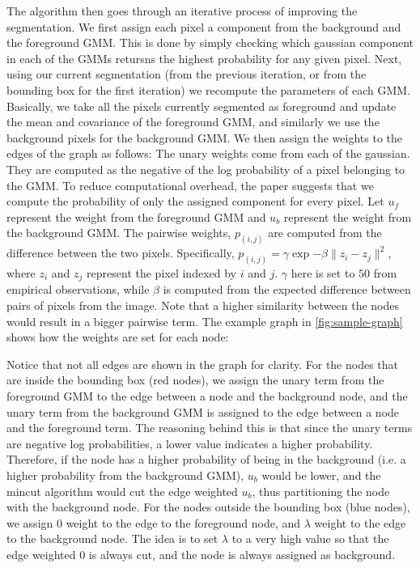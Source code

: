 \documentclass[10pt,twocolumn,letterpaper]{article}
\begin{document}
The algorithm then goes through an iterative process of improving the segmentation.  We first assign each pixel a component from the background and the foreground GMM. This is done by simply checking which gaussian component in each of the GMMs retursns the highest probability for any given pixel. Next, using our current segmentation (from the previous iteration, or from the bounding box for the first iteration) we recompute the parameters of each GMM. Basically, we take all the pixels currently segmented as foreground and update the mean and covariance of the foreground GMM, and similarly we use the background pixels for the background GMM. We then assign the weights to the edges of the graph as follows: The unary weights come from each of the gaussian. They are computed as the negative of the log probability of a pixel belonging to the GMM. To reduce computational overhead, the paper suggests that we compute the probability of only the assigned component for every pixel. Let $u_f$ represent the weight from the foreground GMM and $u_b$ represent the weight from the background GMM. The pairwise weights, $p_{(i,j)}$ are computed from the difference between the two pixels. Specifically, $p_{(i,j)} = \gamma \exp{-\beta\|z_i - z_j\|^2}$, where $z_i$ and $z_j$ represent the pixel indexed by $i$ and $j$. $\gamma$ here is set to $50$ from empirical observations, while $\beta$ is computed from the expected difference between pairs of pixels from the image. Note that a higher similarity between the nodes would result in a bigger pairwise term. The example graph in \ref{fig:sample-graph} shows how the weights are set for each node:

Notice that not all edges are shown in the graph for clarity. For the nodes that are inside the bounding box (red nodes), we assign the unary term from the foreground GMM to the edge between a node and the background node, and the unary term from the background GMM is assigned to the edge between a node and the foreground term. The reasoning behind this is that since the unary terms are negative log probabilities, a lower value indicates a higher probability. Therefore, if the node has a higher probability of being in the background (i.e. a higher probability from the background GMM), $u_b$ would be lower, and the mincut algorithm would cut the edge weighted $u_b$, thus partitioning the node with the background node. For the nodes outside the bounding box (blue nodes), we assign 0 weight to the edge to the foreground node, and $\lambda$ weight to the edge to the background node. The idea is to set $\lambda$ to a very high value so that the edge weighted 0 is always cut, and the node is always assigned as background. 
\end{document}
